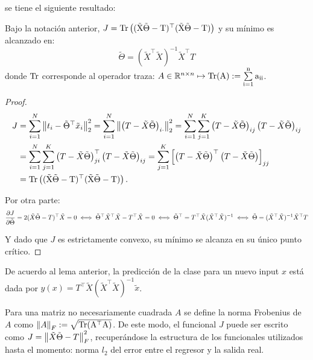 se tiene el siguiente resultado:

\begin{lemma}
	Bajo la notación anterior, $J=\operatorfont{Tr} \left((\tX\tilde{\Theta}-T)^\top (\tX\tilde{\Theta}-T)\right)$ y su mínimo es alcanzado en: 
	\begin{equation}
		\tilde{\Theta} = (\tilde{X}^\top\tilde{X})^{-1}\tilde{X}^\top T
	\end{equation}
	donde $\operatorfont{Tr}$ corresponde al operador traza: $A\in\R^{n\times n}\mapsto \operatorfont{Tr}(A):=\sum\limits_{i=1}^n a_{ii}$.
\end{lemma}

\begin{proof}
\begin{align}
	J &= \sum_{i=1}^N \norm{t_i - \tilde{\Theta}^\top\tx_i}_2^2 = \sum_{i=1}^N \norm{\left(T - \tX\tilde{\Theta}\right)_{i\cdot}}_2^2 = \sum_{i=1}^N \sum_{j=1}^K \left(T - \tX\tilde{\Theta}\right)_{ij} \left(T - \tX\tilde{\Theta}\right)_{ij}\\
	&= \sum_{i=1}^N \sum_{j=1}^K \left(T - \tX\tilde{\Theta}\right)^\top_{ji} \left(T - \tX\tilde{\Theta}\right)_{ij} =  \sum_{j=1}^K \left[\left(T - \tX\tilde{\Theta}\right)^\top \left(T - \tX\tilde{\Theta}\right)\right]_{jj}\\
	&=\operatorfont{Tr} \left((\tX\tilde{\Theta}-T)^\top (\tX\tilde{\Theta}-T)\right).
\end{align}
	
Por otra parte:
\begin{equation}
	\frac{\partial J}{\partial\tilde{\Theta}} = 2(\tilde{X}\tilde{\Theta}-T)^\top\tilde{X}=0 \iff \tilde{\Theta}^\top\tilde{X}^\top\tilde{X} - T^\top\tilde{X} = 0 \iff \tilde{\Theta}^\top = T^\top\tilde{X}(\tilde{X}^\top\tilde{X})^{-1}\iff \tilde{\Theta} = (\tilde{X}^\top\tilde{X})^{-1}\tilde{X}^\top T
	\end{equation}
	
Y dado que $J$ es estrictamente convexo, su mínimo se alcanza en su único punto crítico.	

\end{proof}

De acuerdo al lema anterior, la predicción de la clase para un nuevo input $x$ está dada por $ y(x) = T^\top\tilde{X}(\tilde{X}^\top\tilde{X})^{-1}\tilde{x}$.

\begin{remark}
	Para una matriz no necesariamente cuadrada $A$ se define la norma Frobenius de $A$ como $\norm{A}_F := \sqrt{\operatorfont{Tr}(A^\top A)}$. De este modo, el funcional $J$ puede ser escrito como $J = \left\lVert\tilde{X}\tilde{\Theta}-T\right\rVert_F^2$, recuperándose la estructura de los funcionales utilizados hasta el momento: norma $l_2$ del error entre el regresor y la salida real.
	\end{remark}

